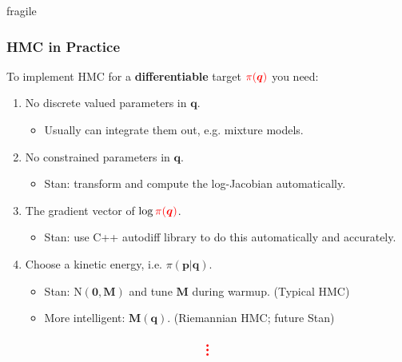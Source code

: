 \documentclass[xcolor=dvipsnames]{beamer}
\begin{document}
\begin{frame}{fragile}
\frametitle{HMC in Practice}
To implement HMC for a \textbf{differentiable} target ${\color{red}\pi(\bm{q})}$ you need:
\vspace{0.2cm}
\begin{enumerate}
\item No discrete valued parameters in $\bm{q}$.
\begin{itemize}
\item Usually can integrate them out, e.g. mixture models.
\end{itemize}
\vspace{0.2cm}
\item No constrained parameters in $\bm{q}$.
\begin{itemize}
\item Stan: transform and compute the log-Jacobian automatically.
\end{itemize}
\vspace{0.2cm}
\item The gradient vector of $\log {\color{red}\pi(\bm{q})}$.
\begin{itemize}
\item Stan: use C++ autodiff library to do this automatically and accurately.
\end{itemize}
\vspace{0.2cm}
\item Choose a kinetic energy, i.e. $\pi(\bm{p}|\bm{q})$.
\begin{itemize}
\item Stan: $\mathrm{N}(\bm{0}, \bm{M})$ and tune $\bm{M}$ during warmup. (Typical HMC)
\item More intelligent: $\bm{M}(\bm{q})$. (Riemannian HMC; future Stan)
\end{itemize}
\end{enumerate}
\begin{align*}
{\color{red}\Huge{\vdots}}
\end{align*}
\end{frame}
\end{document}
